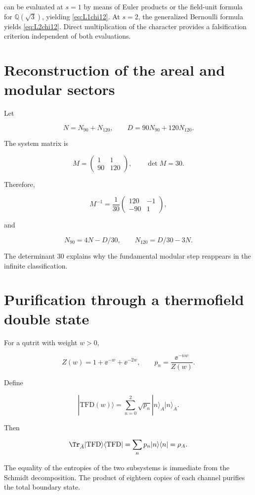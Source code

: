 can be evaluated at \(s=1\) by means of Euler products or the field-unit formula for \(\mathbb Q(\sqrt3)\), yielding \cref{eq:L1chi12}. At \(s=2\), the generalized Bernoulli formula yields \cref{eq:L2chi12}. Direct multiplication of the character provides a falsification criterion independent of both evaluations.

\section{Reconstruction of the areal and modular sectors}

Let

\[
N=N_{90}+N_{120},\qquad D=90N_{90}+120N_{120}.
\]

The system matrix is

\[
M=\begin{pmatrix}1&1\\90&120\end{pmatrix},
\qquad \det M=30.
\]

Therefore,

\[
M^{-1}=\frac1{30}
\begin{pmatrix}120&-1\\-90&1\end{pmatrix},
\]

and

\[
N_{90}=4N-D/30,\qquad N_{120}=D/30-3N.
\]

The determinant \(30\) explains why the fundamental modular step reappears in the infinite classification.

\section{Purification through a thermofield double state}

For a qutrit with weight \(w>0\),

\[
Z(w)=1+\ee^{-w}+\ee^{-2w},
\qquad p_n=\frac{\ee^{-nw}}{Z(w)}.
\]

Define

\[
|\mathrm{TFD}(w)\rangle=\sum_{n=0}^2\sqrt{p_n}
|n\rangle_A|n\rangle_{\bar A}.
\]

Then

\[
\Tr_{\bar A}|\mathrm{TFD}\rangle\langle\mathrm{TFD}|
=\sum_np_n|n\rangle\langle n|=\rho_A.
\]

The equality of the entropies of the two subsystems is immediate from the Schmidt decomposition. The product of eighteen copies of each channel purifies the total boundary state.

